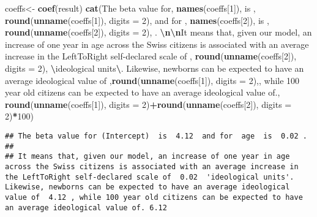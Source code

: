 \documentclass[
]{book}
\newenvironment{Shaded}{\begin{snugshade}}{\end{snugshade}}
\newcommand{\AttributeTok}[1]{\textcolor[rgb]{0.13,0.29,0.53}{#1}}
\newcommand{\DecValTok}[1]{\textcolor[rgb]{0.00,0.00,0.81}{#1}}
\newcommand{\FunctionTok}[1]{\textcolor[rgb]{0.13,0.29,0.53}{\textbf{#1}}}
\newcommand{\NormalTok}[1]{#1}
\newcommand{\OtherTok}[1]{\textcolor[rgb]{0.56,0.35,0.01}{#1}}
\newcommand{\SpecialCharTok}[1]{\textcolor[rgb]{0.81,0.36,0.00}{\textbf{#1}}}
\newcommand{\StringTok}[1]{\textcolor[rgb]{0.31,0.60,0.02}{#1}}
\begin{document}
\begin{Shaded}
\begin{Highlighting}[]
\NormalTok{coeffs}\OtherTok{\textless{}{-}} \FunctionTok{coef}\NormalTok{(result)}
\FunctionTok{cat}\NormalTok{(}\StringTok{\textquotesingle{}The beta value for\textquotesingle{}}\NormalTok{, }\FunctionTok{names}\NormalTok{(coeffs[}\DecValTok{1}\NormalTok{]), }\StringTok{\textquotesingle{} is \textquotesingle{}}\NormalTok{, }\FunctionTok{round}\NormalTok{(}\FunctionTok{unname}\NormalTok{(coeffs[}\DecValTok{1}\NormalTok{]), }\AttributeTok{digits =} \DecValTok{2}\NormalTok{), }\StringTok{\textquotesingle{} and for \textquotesingle{}}\NormalTok{, }\FunctionTok{names}\NormalTok{(coeffs[}\DecValTok{2}\NormalTok{]), }\StringTok{\textquotesingle{} is \textquotesingle{}}\NormalTok{, }\FunctionTok{round}\NormalTok{(}\FunctionTok{unname}\NormalTok{(coeffs[}\DecValTok{2}\NormalTok{]), }\AttributeTok{digits =} \DecValTok{2}\NormalTok{), }\StringTok{\textquotesingle{}. }\SpecialCharTok{\textbackslash{}n\textbackslash{}n}\StringTok{It means that, given our model, an increase of one year in age across the Swiss citizens is associated with an average increase in the LeftToRight self{-}declared scale of \textquotesingle{}}\NormalTok{, }\FunctionTok{round}\NormalTok{(}\FunctionTok{unname}\NormalTok{(coeffs[}\DecValTok{2}\NormalTok{]), }\AttributeTok{digits =} \DecValTok{2}\NormalTok{), }\StringTok{\textquotesingle{} }\SpecialCharTok{\textbackslash{}\textquotesingle{}}\StringTok{ideological units}\SpecialCharTok{\textbackslash{}\textquotesingle{}}\StringTok{. Likewise, newborns can be expected to have an average ideological value of \textquotesingle{}}\NormalTok{,}\FunctionTok{round}\NormalTok{(}\FunctionTok{unname}\NormalTok{(coeffs[}\DecValTok{1}\NormalTok{]), }\AttributeTok{digits =} \DecValTok{2}\NormalTok{),}\StringTok{\textquotesingle{}, while 100 year old citizens can be expected to have an average ideological value of.\textquotesingle{}}\NormalTok{, }\FunctionTok{round}\NormalTok{(}\FunctionTok{unname}\NormalTok{(coeffs[}\DecValTok{1}\NormalTok{]), }\AttributeTok{digits =} \DecValTok{2}\NormalTok{)}\SpecialCharTok{+}\FunctionTok{round}\NormalTok{(}\FunctionTok{unname}\NormalTok{(coeffs[}\DecValTok{2}\NormalTok{]), }\AttributeTok{digits =} \DecValTok{2}\NormalTok{)}\SpecialCharTok{*}\DecValTok{100}\NormalTok{)}
\end{Highlighting}
\end{Shaded}

\begin{verbatim}
## The beta value for (Intercept)  is  4.12  and for  age  is  0.02 . 
## 
## It means that, given our model, an increase of one year in age across the Swiss citizens is associated with an average increase in the LeftToRight self-declared scale of  0.02  'ideological units'. Likewise, newborns can be expected to have an average ideological value of  4.12 , while 100 year old citizens can be expected to have an average ideological value of. 6.12
\end{verbatim}
\end{document}
